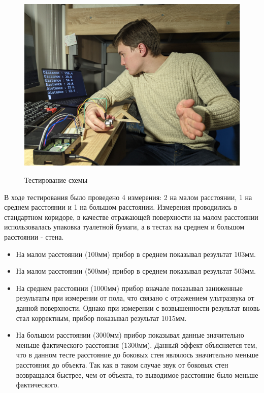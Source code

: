 \documentclass[a4paper, 14pt]{article}
\begin{document}
\begin{figure}[H]
	\centering
	\includegraphics[width=15cm]{screenshots/12.png}\\
	\caption{Тестирование схемы}
\end{figure}

В ходе тестирования было проведено 4 измерения: 2 на малом расстоянии, 1 на среднем расстоянии и 1
на большом расстоянии. Измерения проводились в стандартном коридоре, в качестве отражающей поверхности на малом расстоянии использовалась упаковка туалетной бумаги, а в тестах на среднем
и большом расстоянии - стена.

\begin{itemize}
	\item На малом расстоянии (100мм) прибор в среднем показывал результат 103мм.
	\item На малом расстоянии (500мм) прибор в среднем показывал результат 503мм.
	\item На среднем расстоянии (1000мм) прибор вначале показывал заниженные результаты при измерении от пола, что связано с отражением ультразвука от данной поверхности. Однако при измерении с возвышенности результат вновь стал корректным, прибор показывал результат 1015мм.
	\item На большом расстоянии (3000мм) прибор показывал данные значительно меньше фактического расстояния (1300мм). Данный эффект объясняется тем, что в данном тесте расстояние до боковых стен являлось значительно меньше расстояния до объекта. Так как в таком случае звук от боковых стен возвращался быстрее, чем от объекта, то выводимое расстояние было меньше фактического.
\end{itemize}
\end{document}
